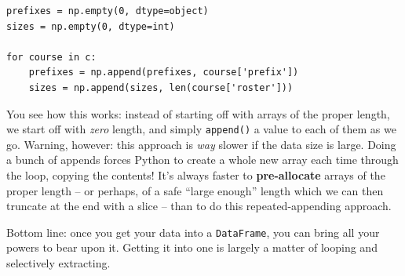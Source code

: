\begin{Verbatim}[fontsize=\small,samepage=true,frame=single,framesep=3mm]
prefixes = np.empty(0, dtype=object)
sizes = np.empty(0, dtype=int)

for course in c:
    prefixes = np.append(prefixes, course['prefix'])
    sizes = np.append(sizes, len(course['roster']))
\end{Verbatim}


You see how this works: instead of starting off with arrays of the proper
length, we start off with \textit{zero} length, and simply \texttt{append()} a
value to each of them as we go. Warning, however: this approach is \textit{way}
slower if the data size is large. Doing a bunch of appends forces Python to
create a whole new array each time through the loop, copying the contents! It's
always faster to \textbf{pre-allocate} arrays of the proper length -- or
perhaps, of a safe ``large enough'' length which we can then truncate at the
end with a slice -- than to do this repeated-appending approach.

Bottom line: once you get your data into a \texttt{DataFrame}, you can bring
all your powers to bear upon it. Getting it into one is largely a matter of
looping and selectively extracting.


%
%


